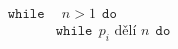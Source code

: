 \documentclass[preview]{standalone}
\begin{document}
\begin{align*}
\mathtt{while} & \:\: n > 1 \:\:  \mathtt{do}  \\&\!\!\!\! \mathtt{while}  \:\: p_i \text{ dělí } n \:\:  \mathtt{do}
\end{align*}
\end{document}
